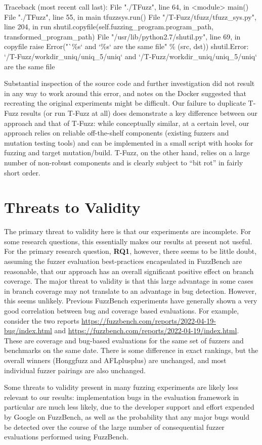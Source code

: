 {\scriptsize
\begin{code}
  Traceback (most recent call last):
  File "./TFuzz", line 64, in <module>
    main()
  File "./TFuzz", line 55, in main
    tfuzzsys.run()
  File "/T-Fuzz/tfuzz/tfuzz\_sys.py", line 204, in run
    shutil.copyfile(self.fuzzing\_program.program\_path, transformed\_program\_path)
  File "/usr/lib/python2.7/shutil.py", line 69, in copyfile
    raise Error("`\%s` and `\%s` are the same file" \% (src, dst))
shutil.Error: `/T-Fuzz/workdir\_uniq/uniq\_5/uniq` and `/T-Fuzz/workdir\_uniq/uniq\_5/uniq` are the same file
\end{code}
}

Substantial inspection of the source code and further investigation did not result in any way to work around this error, and notes on the Docker suggested that recreating the original experiments might be difficult.  Our failure to duplicate T-Fuzz results (or run T-Fuzz at all) does demonstrate a key difference between our approach and that of T-Fuzz:  while conceptually similar, at a certain level, our approach relies on reliable off-the-shelf components (existing fuzzers and mutation testing tools) and can be implemented in a small script with hooks for fuzzing and target mutation/build.  T-Fuzz, on the other hand, relies on a large number of non-robust components and is clearly subject to ``bit rot'' in fairly short order.

\section{Threats to Validity}

The primary threat to validity here is that our experiments are incomplete.  For some research questions, this essentially makes our results at present not useful.  For the primary research question, {\bf RQ1}, however, there seems to be little doubt, assuming the fuzzer evaluation best-practices encapsulated in FuzzBench are reasonable, that our approach has an overall significant positive effect on branch coverage.  The major threat to validity is that this large advantage in some cases in branch coverage may not translate to an advantage in bug detection.  However, this seems unlikely.  Previous FuzzBench experiments have generally shown a very good correlation between bug and coverage based evaluations.  For example, consider the two reports \url{https://fuzzbench.com/reports/2022-04-19-bug/index.html} and \url{https://fuzzbench.com/reports/2022-04-19/index.html}.  These are coverage and bug-based evaluations for the same set of fuzzers and benchmarks on the same date.  There is some difference in exact rankings, but the overall winners (Honggfuzz and AFLplusplus) are unchanged, and most individual fuzzer pairings are also unchanged.

Some threats to validity present in many fuzzing experiments are likely less relevant to our results:  implementation bugs in the evaluation framework in particular are much less likely, due to the developer support and effort expended by Google on FuzzBench, as well as the probability that any major bugs would be detected over the course of the large number of consequential fuzzer evaluations performed using FuzzBench.